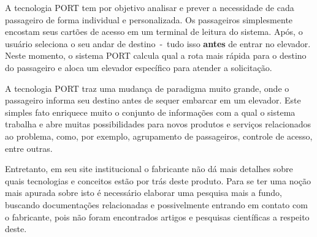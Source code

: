 A tecnologia PORT tem por objetivo analisar e prever a necessidade de cada
passageiro de forma individual e personalizada. Os passageiros simplesmente
encostam seus cartões de acesso em um terminal de leitura do sistema. Após, o
usuário seleciona o seu andar de destino~-~tudo isso \textbf{antes} de entrar no
elevador. Neste momento, o sistema PORT calcula qual a rota mais rápida para o
destino do passageiro e aloca um elevador específico para atender a solicitação.

A tecnologia PORT traz uma mudança de paradigma muito grande, onde o passageiro
informa seu destino antes de sequer embarcar em um elevador. Este simples fato
enriquece muito o conjunto de informações com a qual o sistema trabalha e abre
muitas possibilidades para novos produtos e serviços relacionados ao problema,
como, por exemplo, agrupamento de passageiros, controle de acesso, entre outras.

Entretanto, em seu site institucional o fabricante não dá mais detalhes sobre
quais tecnologias e conceitos estão por trás deste produto. Para se ter uma
noção mais apurada sobre isto é necessário elaborar uma pesquisa mais a fundo,
buscando documentações relacionadas e possivelmente entrando em contato com o
fabricante, pois não foram encontrados artigos e pesquisas científicas a
respeito deste. 
